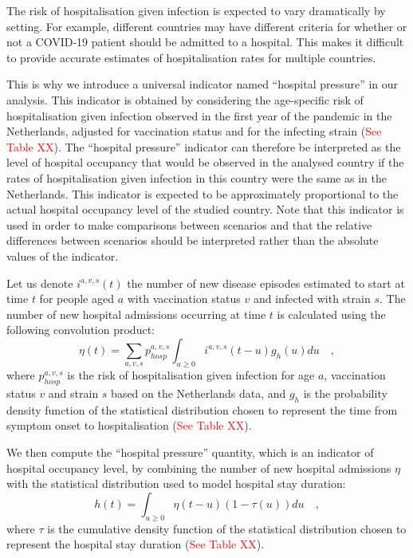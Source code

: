 The risk of hospitalisation given infection is expected to vary dramatically by setting.
For example, different countries may have different criteria for whether or not a COVID-19 
patient should be admitted to a hospital. This makes it difficult to provide accurate 
estimates of hospitalisation rates for multiple countries. 

This is why we introduce a universal indicator named ``hospital pressure'' in our analysis. This indicator
is obtained by considering the age-specific risk of hospitalisation given infection observed in the first year
of the pandemic in the Netherlands, adjusted for vaccination status and for the infecting strain (\textcolor{red}{See Table XX}).
The ``hospital pressure'' indicator can therefore be interpreted as the level of hospital occupancy that
would be observed in the analysed country if the rates of hospitalisation given infection in this country were the same
as in the Netherlands. This indicator is expected to be approximately proportional to the actual hospital occupancy level of the 
studied country. Note that this indicator is used in order to make comparisons between scenarios and that the relative
differences between scenarios should be interpreted rather than the absolute values of the indicator. 

Let us denote $i^{a,v,s}(t)$ the number of new disease episodes estimated to start at time $t$ for people aged $a$ with vaccination status $v$
and infected with strain $s$. The number of new hospital admissions occurring at time $t$ is calculated using the following
convolution product:
\begin{equation}
 \eta(t) = \sum_{a,v,s} p_{hosp}^{a,v,s} \int_{u \geq 0}  i^{a,v,s}(t-u)g_{h}(u) du   \quad,
 \end{equation}
where $p_{hosp}^{a,v,s}$ is the risk of hospitalisation given infection for age $a$, vaccination status $v$ and strain $s$ 
based on the Netherlands data, and $g_h$ is the probability density function of the statistical distribution chosen to represent the 
time from symptom onset to hospitalisation (\textcolor{red}{See Table XX}). 

We then compute the ``hospital pressure'' quantity, which is an indicator of hospital occupancy level, by combining the number of new 
hospital admissions $\eta$ with the statistical distribution used to model hospital stay duration:
\begin{equation}
h(t) = \int_{u \geq 0}  \eta(t-u) (1 - \tau(u)) du   \quad,
\end{equation}
where $\tau$ is the cumulative density function of the statistical distribution chosen to represent the 
hospital stay duration (\textcolor{red}{See Table XX}). 
